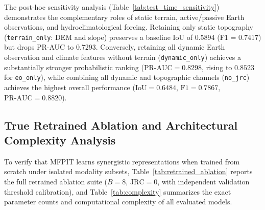 \documentclass[journal]{IEEEtran}
\begin{document}
The post-hoc sensitivity analysis (Table~\ref{tab:test_time_sensitivity}) demonstrates the complementary roles of static terrain, active/passive Earth observations, and hydroclimatological forcing. Retaining only static topography (\texttt{terrain\_only}: DEM and slope) preserves a baseline IoU of 0.5894 (F1 = 0.7417) but drops PR-AUC to 0.7293. Conversely, retaining all dynamic Earth observation and climate features without terrain (\texttt{dynamic\_only}) achieves a substantially stronger probabilistic ranking ($\text{PR-AUC} = 0.8298$, rising to $0.8523$ for \texttt{eo\_only}), while combining all dynamic and topographic channels (\texttt{no\_jrc}) achieves the highest overall performance ($\text{IoU} = 0.6484$, $\text{F1} = 0.7867$, $\text{PR-AUC} = 0.8820$).

\subsection{True Retrained Ablation and Architectural Complexity Analysis}
To verify that MFPIT learns synergistic representations when trained from scratch under isolated modality subsets, Table~\ref{tab:retrained_ablation} reports the full retrained ablation suite ($B=8$, $\text{JRC}=0$, with independent validation threshold calibration), and Table~\ref{tab:complexity} summarizes the exact parameter counts and computational complexity of all evaluated models.

\begin{table}[!t]
\caption{Retrained Ablation Study Results ($B=8, \text{JRC}=0$) with 95\% Block Bootstrap CIs ($1,000$ Replicates)}
\label{tab:retrained_ablation}
\centering
{}
\end{table}
\end{document}
